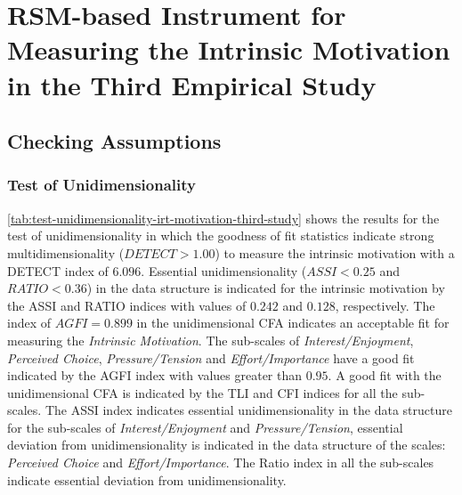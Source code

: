 \newpage
\section{RSM-based Instrument for Measuring the Intrinsic Motivation in the Third Empirical Study}
\label{sec:irt-intrinsic-motivation-third-study}

\subsection{Checking Assumptions}

\subsubsection*{Test of Unidimensionality}

\autoref{tab:test-unidimensionality-irt-motivation-third-study} shows the results for the test of unidimensionality in which the goodness of fit statistics indicate strong multidimensionality ($DETECT > 1.00$) to measure the intrinsic motivation with a DETECT index of $6.096$. 
Essential unidimensionality ($ASSI < 0.25$ and $RATIO < 0.36$) in the data structure is indicated for the intrinsic motivation by the ASSI and RATIO indices with values of $0.242$ and $0.128$, respectively.
The index of $AGFI = 0.899$ in the unidimensional CFA indicates an acceptable fit for measuring the \emph{Intrinsic Motivation}.
The sub-scales of \emph{Interest/Enjoyment}, \emph{Perceived Choice}, \emph{Pressure/Tension} and \emph{Effort/Importance} have a good fit indicated by the AGFI index with values greater than $0.95$.
A good fit with the unidimensional CFA is indicated by the TLI and CFI indices for all the sub-scales.
The ASSI index indicates essential unidimensionality in the data structure for the sub-scales of \emph{Interest/Enjoyment} and \emph{Pressure/Tension}, essential deviation from unidimensionality is indicated in the data structure of the scales: \emph{Perceived Choice} and \emph{Effort/Importance}.
The Ratio index in all the sub-scales indicate essential deviation from unidimensionality.

